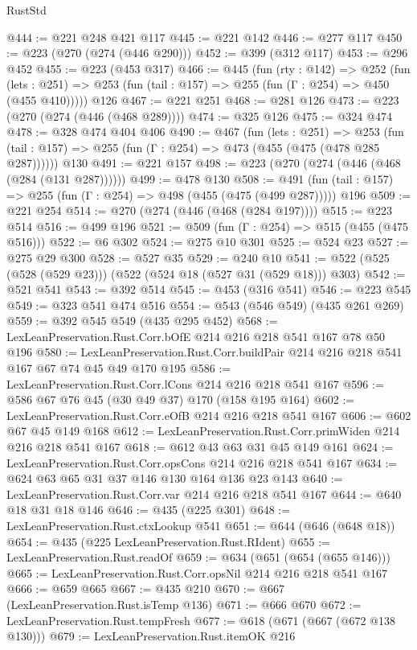 \begin{lexlean}{RustStd}
\begin{coremodule}
@444 := @221 @248 @421 @117
@445 := @221 @142
@446 := @277 @117
@450 := @223 (@270 (@274 (@446 @290)))
@452 := @399 (@312 @117)
@453 := @296 @452
@455 := @223 (@453 @317)
@466 := @445
    (fun (rty : @142) =>
    @252
      (fun (lets : @251) => @253 (fun (tail : @157) => @255 (fun (Γ : @254) => @450 (@455 @410)))))
    @126
@467 := @221 @251
@468 := @281 @126
@473 := @223 (@270 (@274 (@446 (@468 @289))))
@474 := @325 @126
@475 := @324 @474
@478 := @328 @474 @404 @406
@490 := @467
    (fun (lets : @251) =>
    @253 (fun (tail : @157) => @255 (fun (Γ : @254) => @473 (@455 (@475 (@478 @285 @287))))))
    @130
@491 := @221 @157
@498 := @223 (@270 (@274 (@446 (@468 (@284 (@131 @287))))))
@499 := @478 @130
@508 := @491 (fun (tail : @157) => @255 (fun (Γ : @254) => @498 (@455 (@475 (@499 @287))))) @196
@509 := @221 @254
@514 := @270 (@274 (@446 (@468 (@284 @197))))
@515 := @223 @514
@516 := @499 @196
@521 := @509 (fun (Γ : @254) => @515 (@455 (@475 @516)))
@522 := @6 @302
@524 := @275 @10 @301
@525 := @524 @23
@527 := @275 @29 @300
@528 := @527 @35
@529 := @240 @10
@541 := @522 (@525 (@528 (@529 @23))) (@522 (@524 @18 (@527 @31 (@529 @18))) @303)
@542 := @521 @541
@543 := @392 @514
@545 := @453 (@316 @541)
@546 := @223 @545
@549 := @323 @541 @474 @516
@554 := @543 (@546 @549) (@435 @261 @269)
@559 := @392 @545 @549 (@435 @295 @452)
@568 := LexLeanPreservation.Rust.Corr.bOfE @214 @216 @218 @541 @167 @78 @50 @196
@580 := LexLeanPreservation.Rust.Corr.buildPair @214 @216 @218 @541 @167 @67 @74 @45 @49 @170 @195
@586 := LexLeanPreservation.Rust.Corr.lCons @214 @216 @218 @541 @167
@596 := @586 @67 @76 @45 (@30 @49 @37) @170 (@158 @195 @164)
@602 := LexLeanPreservation.Rust.Corr.eOfB @214 @216 @218 @541 @167
@606 := @602 @67 @45 @149 @168
@612 := LexLeanPreservation.Rust.Corr.primWiden @214 @216 @218 @541 @167
@618 := @612 @43 @63 @31 @45 @149 @161
@624 := LexLeanPreservation.Rust.Corr.opsCons @214 @216 @218 @541 @167
@634 := @624 @63 @65 @31 @37 @146 @130 @164 @136 @23 @143
@640 := LexLeanPreservation.Rust.Corr.var @214 @216 @218 @541 @167
@644 := @640 @18 @31 @18 @146
@646 := @435 (@225 @301)
@648 := LexLeanPreservation.Rust.ctxLookup @541
@651 := @644 (@646 (@648 @18))
@654 := @435 (@225 LexLeanPreservation.Rust.RIdent)
@655 := LexLeanPreservation.Rust.readOf
@659 := @634 (@651 (@654 (@655 @146)))
@665 := LexLeanPreservation.Rust.Corr.opsNil @214 @216 @218 @541 @167
@666 := @659 @665
@667 := @435 @210
@670 := @667 (LexLeanPreservation.Rust.isTemp @136)
@671 := @666 @670
@672 := LexLeanPreservation.Rust.tempFresh
@677 := @618 (@671 (@667 (@672 @138 @130)))
@679 := LexLeanPreservation.Rust.itemOK @216

\end{coremodule}
\end{lexlean}
